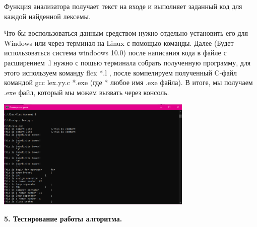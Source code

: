 \documentclass[12pt]{report}
\begin{document}
Функция анализатора получает текст на входе и выполняет заданный код для каждой найденной лексемы.

Что бы воспользоваться данным средством нужно отдельно установить его для Windows или через терминал на Linux с помощью команды. Далее (Будет использоваться система windoows 10.0) после написания кода в файле с расширением .l нужно с пощью терминала собрать полученную программу, для этого используем команду flex *.l , после компелируем полученный C-файл командой gcc lex.yy.c *.exe (где * любое имя .exe файла). В итоге, мы получаем .exe файл, который мы можем вызвать через консоль.

\begin{center}
\includegraphics[width=0.7\textwidth]{assets/cmd.png}
\end{center}

\begin{center}
\Large{\textbf{5. Тестирование работы алгоритма.}}
\end{center}
\end{document}
